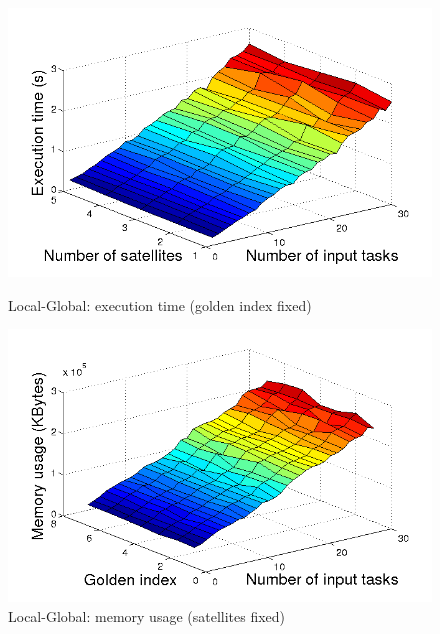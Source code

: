 \begin{figure}[h!]
  \begin{minipage}[b]{0.5\linewidth}
    \includegraphics[width=\linewidth]{Figures/tLG_goldenfix.png}
    \caption{Local-Global: execution time (golden index fixed)}\label{fig_tLG_goldenfix}
  \end{minipage}
    \begin{minipage}[b]{0.5\linewidth}
    \includegraphics[width=\linewidth]{Figures/mLG_satsfix.png}
    \caption{Local-Global: memory usage (satellites fixed)}\label{fig_mLG_satsfix}
  \end{minipage}
\end{figure}
